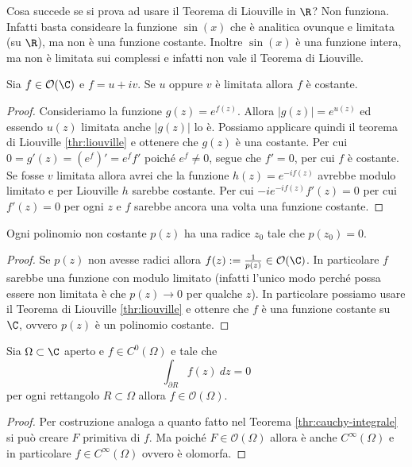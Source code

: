 \begin{remark}
	Cosa succede se si prova ad usare il Teorema di Liouville in $\R$? 
	Non funziona. Infatti basta consideare la funzione $\sin(x)$ che è 
	analitica ovunque e limitata (su $\R$), ma non è una funzione costante. 
	Inoltre $\sin(x)$ è una funzione intera, ma non è limitata sui complessi
	e infatti non vale il Teorema di Liouville.
\end{remark}

\begin{corollary}
  Sia $f \in \mathcal{O}(\C)$ e $f = u + iv$. Se $u$ oppure $v$ è limitata
  allora $f$ è costante.
  \label{cor:stronger-liouville-constant-function}
\end{corollary}
\begin{proof}
  Consideriamo la funzione $g(z) = e^{f(z)}$. Allora $|g(z)| = e^{u(z)}$ ed
  essendo $u(z)$ limitata anche $|g(z)|$ lo è. Possiamo applicare quindi il
  teorema di Liouville \ref{thr:liouville} e ottenere che $g(z)$ è una
  costante. Per cui $0 = g'(z) = (e^f)' = e^f f'$ poiché $e^f \neq 0$, segue
  che $f' = 0$, per cui $f$ è costante.\\
  
  Se fosse $v$ limitata allora avrei che la funzione $h(z) = e^{-if(z)}$
  avrebbe modulo limitato e per Liouville $h$ sarebbe costante. Per cui
  $-i e^{-if(z)} f'(z) = 0$ per cui $f'(z) = 0$ per ogni $z$ e $f$ sarebbe
  ancora una volta una funzione costante.
\end{proof}

\begin{theorem}
  Ogni polinomio non costante $p(z)$ ha una radice $z_0$ tale che $p(z_0)
  = 0$. 
  \label{thr:fondamentale-dell-algebra}
\end{theorem}
\begin{proof}
  Se $p(z)$ non avesse radici allora $f(z) := \frac{1}{p(z)} \in
  \mathcal{O}(\C)$. In particolare $f$ sarebbe una funzione con modulo
  limitato (infatti l'unico modo perché possa essere non limitata è che
  $p(z) \to 0$ per qualche $z$). In particolare possiamo usare il Teorema di
  Liouville \ref{thr:liouville} e ottenre che $f$ è una funzione costante su
  $\C$, ovvero $p(z)$ è un polinomio costante.
\end{proof}

\begin{theorem}[Morera]
  Sia $\Omega \subset \C$ aperto e $f \in C^0(\Omega)$ e tale che 
    \begin{equation*}
      \int_{\partial R} f(z)\ dz = 0 
    \end{equation*}
    per ogni rettangolo $R \subset \Omega$ allora $f \in
    \mathcal{O}(\Omega)$. 
    \label{thr:morera}
\end{theorem}
\begin{proof}
  Per costruzione analoga a quanto fatto nel Teorema
  \ref{thr:cauchy-integrale} si può creare $F$ primitiva di $f$. Ma poiché
  $F \in \mathcal{O}(\Omega)$ allora è anche $C^{\infty}(\Omega)$ e in
  particolare $f \in C^{\infty}(\Omega)$ ovvero è olomorfa. 
\end{proof}

